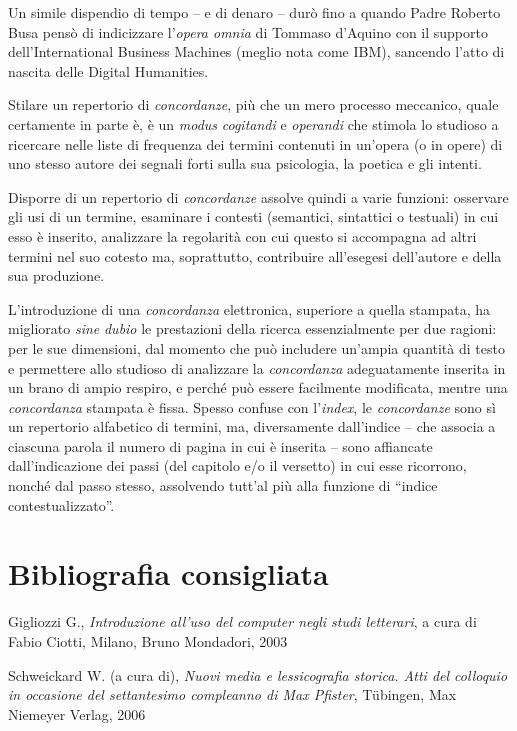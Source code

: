 \documentclass[
  b5paper,
  twoside,
  12pt,
  chapterprefix=false,
  bibliography=totocnumbered,
  parskip=false]{scrbook}
\begin{document}
Un simile dispendio di tempo -- e di denaro -- durò fino a quando Padre
Roberto Busa pensò di indicizzare l'\emph{opera omnia} di Tommaso d'Aquino
con il supporto dell'International Business Machines (meglio nota come
IBM), sancendo l'atto di nascita delle Digital Humanities.

Stilare un repertorio di \emph{concordanze}, più che un mero processo
meccanico, quale certamente in parte è, è un \emph{modus} \emph{cogitandi} e
\emph{operandi} che stimola lo studioso a ricercare nelle liste di frequenza
dei termini contenuti in un'opera (o in opere) di uno stesso autore dei
segnali forti sulla sua psicologia, la poetica e gli intenti.

Disporre di un repertorio di \emph{concordanze} assolve quindi a varie
funzioni: osservare gli usi di un termine, esaminare i contesti
(semantici, sintattici o testuali) in cui esso è inserito, analizzare la
regolarità con cui questo si accompagna ad altri termini nel suo cotesto
ma, soprattutto, contribuire all'esegesi dell'autore e della sua
produzione.

L'introduzione di una \emph{concordanza} elettronica, superiore a quella
stampata, ha migliorato \emph{sine} \emph{dubio} le prestazioni della ricerca
essenzialmente per due ragioni: per le sue dimensioni, dal momento che
può includere un'ampia quantità di testo e permettere allo studioso di
analizzare la \emph{concordanza} adeguatamente inserita in un brano di ampio
respiro, e perché può essere facilmente modificata, mentre una
\emph{concordanza} stampata è fissa. Spesso confuse con l'\emph{index}, le
\emph{concordanze} sono sì un repertorio alfabetico di termini, ma,
diversamente dall'indice -- che associa a ciascuna parola il numero di
pagina in cui è inserita -- sono affiancate dall'indicazione dei passi
(del capitolo e/o il versetto) in cui esse ricorrono, nonché dal passo
stesso, assolvendo tutt'al più alla funzione di \enquote{indice
contestualizzato}.

\hypertarget{bibliografia-consigliata-2}{%
\section*{Bibliografia consigliata}\label{bibliografia-consigliata-2}}

Gigliozzi G., \emph{Introduzione all'uso del computer negli studi letterari},
a cura di Fabio Ciotti, Milano, Bruno Mondadori, 2003

Schweickard W. (a cura di), \emph{Nuovi media e lessicografia storica. Atti
del colloquio in occasione del settantesimo compleanno di Max Pfister},
Tübingen, Max Niemeyer Verlag, 2006
\end{document}
